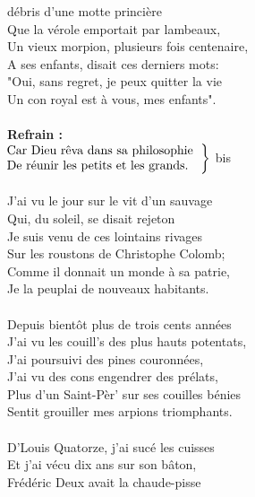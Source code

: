
 débris d'une motte princière
\\Que la vérole emportait par lambeaux,
\\Un vieux morpion, plusieurs fois centenaire,
\\A ses enfants, disait ces derniers mots:
\\"Oui, sans regret, je peux quitter la vie
\\Un con royal est à vous, mes enfants".
\\\\\textbf{Refrain :}
\\
$\left.\begin{tabular}{l}
\hspace{-0.4cm}
Car Dieu rêva dans sa philosophie
\\
\hspace{-0.4cm}
De réunir les petits et les grands.
\end{tabular}\right\rbrace$ bis
\\\\J'ai vu le jour sur le vit d'un sauvage
\\Qui, du soleil, se disait rejeton
\\Je suis venu de ces lointains rivages
\\Sur les roustons de Christophe Colomb;
\\Comme il donnait un monde à sa patrie,
\\Je la peuplai de nouveaux habitants.
\\\\Depuis bientôt plus de trois cents années
\\J'ai vu les couill's des plus hauts potentats,
\\J'ai poursuivi des pines couronnées,
\\J'ai vu des cons engendrer des prélats,
\\Plus d'un Saint-Pèr' sur ses couilles bénies
\\Sentit grouiller mes arpions triomphants.
\\\\D'Louis Quatorze, j'ai sucé les cuisses
\\Et j'ai vécu dix ans sur son bâton,
\\Frédéric Deux avait la chaude-pisse
